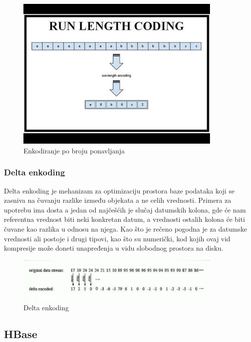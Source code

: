 \documentclass[12pt,oneside]{memoir}
\begin{document}
\begin{figure}[!ht]
  \centering
  \includegraphics[width=0.9\textwidth]{run-length-encoding.jpg}
  \caption{Enkodiranje po broju ponavljanja}
  \label{fig:grafikon}
\end{figure}

\subsubsection{Delta enkoding}
Delta enkoding je mehanizam za optimizaciju prostora baze podataka koji se zasniva na čuvanju razlike između objekata a ne celih vrednosti. Primera za upotrebu ima dosta a jedan od najčešćih je slučaj datumskih kolona, gde će nam referentna vrednost biti neki konkretan datum, a vrednosti ostalih kolona će biti čuvane kao razlika u odnosu na njega. Kao što je rečeno pogodna je za datumske vrednosti ali postoje i drugi tipovi, kao što su numerički, kod kojih ovaj vid kompresije može doneti unapređenja u vidu slobodnog prostora na disku.

\begin{figure}[!ht]
  \centering
  \includegraphics[width=0.9\textwidth]{delta-encoding.png}
  \caption{Delta enkoding}
  \label{fig:grafikon}
\end{figure}

\subsection{HBase}
\end{document}

